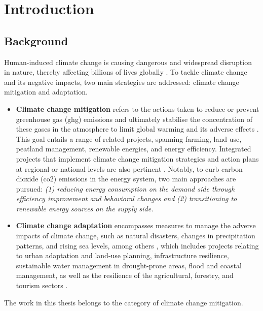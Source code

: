 \chapter{Introduction}


\section{Background}

Human-induced climate change is causing dangerous and widespread disruption in nature, thereby affecting billions of lives globally \cite{ipcc}. 
To tackle climate change and its negative impacts, two main strategies are addressed: climate change mitigation and adaptation.

\begin{itemize}
  \item \textbf{Climate change mitigation} refers to the actions taken to reduce or prevent greenhouse gas (\gls{ghg}) emissions and ultimately stabilise the concentration of these gases in the atmosphere to limit global warming and its adverse effects \cite{handbook}.
  This goal entails a range of related projects, spanning farming, land use, peatland management, renewable energies, and energy efficiency. Integrated projects that implement climate change mitigation strategies and action plans at regional or national levels are also pertinent \cite{ec}.
  Notably, to curb carbon dioxide (\gls{co2}) emissions in the energy system, two main approaches are pursued:
\emph{
  (1) reducing energy consumption on the demand side through efficiency improvement and behavioral changes and
  (2) transitioning to renewable energy sources on the supply side.
}
  \item \textbf{Climate change adaptation} encompasses measures to manage the adverse impacts of climate change, such as natural disasters, changes in precipitation patterns, and rising sea levels, among others \cite{handbook},
  which includes projects relating to urban adaptation and land-use planning, infrastructure resilience, sustainable water management in drought-prone areas, flood and coastal management, as well as the resilience of the agricultural, forestry, and tourism sectors \cite{ec}.  
\end{itemize}

The work in this thesis belongs to the category of climate change mitigation. 



